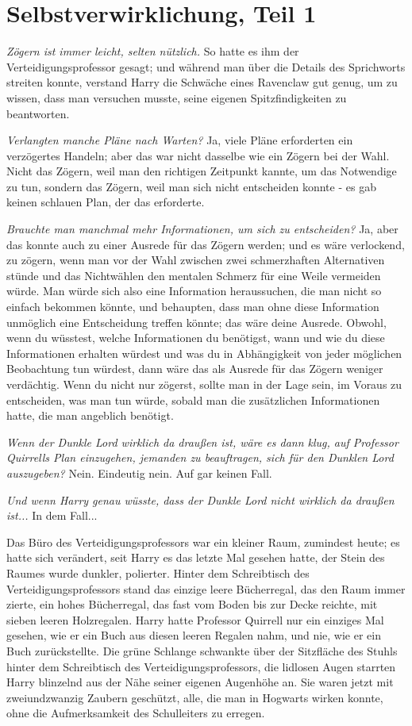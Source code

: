 \chapter{Selbstverwirklichung, Teil 1}

\emph{Zögern ist immer leicht, selten nützlich.} So hatte es ihm der
Verteidigungsprofessor gesagt; und während man über die Details des Sprichworts
streiten konnte, verstand Harry die Schwäche eines Ravenclaw gut genug, um zu
wissen, dass man versuchen musste, seine eigenen Spitzfindigkeiten zu
beantworten.

\emph{Verlangten manche Pläne nach Warten?}
Ja, viele Pläne erforderten ein verzögertes Handeln; aber das war nicht dasselbe
wie ein Zögern bei der Wahl. Nicht das Zögern, weil man den richtigen Zeitpunkt
kannte, um das Notwendige zu tun, sondern das Zögern, weil man sich nicht
entscheiden konnte - es gab keinen schlauen Plan, der das erforderte.

\emph{Brauchte man manchmal mehr Informationen, um sich zu entscheiden?}
Ja, aber das konnte auch zu einer Ausrede für das Zögern werden; und es wäre
verlockend, zu zögern, wenn man vor der Wahl zwischen zwei schmerzhaften
Alternativen stünde und das Nichtwählen den mentalen Schmerz für eine Weile
vermeiden würde. Man würde sich also eine Information heraussuchen, die man
nicht so einfach bekommen könnte, und behaupten, dass man ohne diese Information
unmöglich eine Entscheidung treffen könnte; das wäre deine Ausrede. Obwohl, wenn
du wüsstest, welche Informationen du benötigst, wann und wie du diese
Informationen erhalten würdest und was du in Abhängigkeit von jeder möglichen
Beobachtung tun würdest, dann wäre das als Ausrede für das Zögern weniger
verdächtig. Wenn du nicht nur zögerst, sollte man in der Lage sein, im Voraus zu
entscheiden, was man tun würde, sobald man die zusätzlichen Informationen hatte,
die man angeblich benötigt.

\emph{Wenn der Dunkle Lord wirklich da draußen ist, wäre es dann klug, auf
Professor Quirrells Plan einzugehen, jemanden zu beauftragen, sich für den
Dunklen Lord auszugeben?} Nein. Eindeutig nein. Auf gar keinen Fall.

\emph{Und wenn Harry genau wüsste, dass der Dunkle Lord nicht wirklich da
draußen ist...} In dem Fall...

Das Büro des Verteidigungsprofessors war ein kleiner Raum, zumindest heute; es
hatte sich verändert, seit Harry es das letzte Mal gesehen hatte, der Stein des
Raumes wurde dunkler, polierter. Hinter dem Schreibtisch des
Verteidigungsprofessors stand das einzige leere Bücherregal, das den Raum immer
zierte, ein hohes Bücherregal, das fast vom Boden bis zur Decke reichte, mit
sieben leeren Holzregalen. Harry hatte Professor Quirrell nur ein einziges Mal
gesehen, wie er ein Buch aus diesen leeren Regalen nahm, und nie, wie er ein
Buch zurückstellte. Die grüne Schlange schwankte über der Sitzfläche des Stuhls
hinter dem Schreibtisch des Verteidigungsprofessors, die lidlosen Augen starrten
Harry blinzelnd aus der Nähe seiner eigenen Augenhöhe an. Sie waren jetzt mit
zweiundzwanzig Zaubern geschützt, alle, die man in Hogwarts wirken konnte, ohne
die Aufmerksamkeit des Schulleiters zu erregen.

